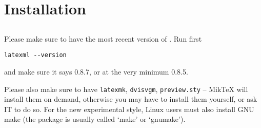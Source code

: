 \documentclass[a4paper]{article}
\theoremstyle{definition}
\begin{document}
\tableofcontents

\section{Installation}

\subsection{\texorpdfstring{\LaTeXML{}}{LaTeXML}}
Please make sure to have the most recent version of \LaTeXML{}. Run first
\begin{lstlisting}
latexml --version
\end{lstlisting}
and make sure it says 0.8.7, or at the very minimum 0.8.5.

Please also make sure to have \texttt{latexmk}, \texttt{dvisvgm}, \texttt{preview.sty} -- MikTeX will install them on demand, otherwise you may have to install them yourself, or ask IT to do so. For the new experimental style, Linux users must also install GNU make (the package is usually called `make' or `gnumake').
\end{document}
